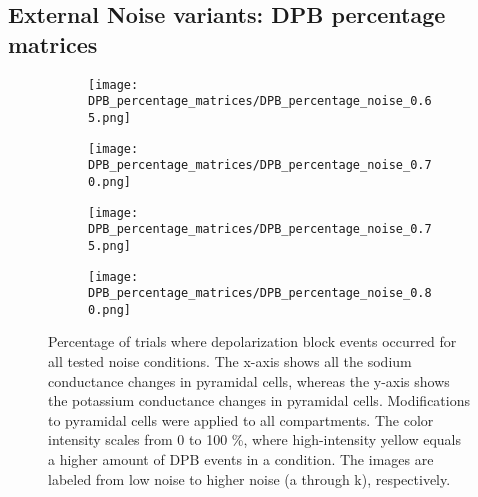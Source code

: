 \subsection{External Noise variants: DPB percentage matrices}\label{subsec:DPB_percentage_matrices}
\begin{figure}[!ht]
    \centering
    \begin{subfigure}{0.48\textwidth}
        \texttt{[image: DPB\_percentage\_matrices/DPB\_percentage\_noise\_0.65.png]}
        \caption{} %
    \end{subfigure}\hfill
    \begin{subfigure}{0.48\textwidth}
        \texttt{[image: DPB\_percentage\_matrices/DPB\_percentage\_noise\_0.70.png]}
        \caption{} %
    \end{subfigure}

    \bigskip %

    \begin{subfigure}{0.48\textwidth}
        \texttt{[image: DPB\_percentage\_matrices/DPB\_percentage\_noise\_0.75.png]}
        \caption{} %
    \end{subfigure}\hfill
    \begin{subfigure}{0.48\textwidth}
        \texttt{[image: DPB\_percentage\_matrices/DPB\_percentage\_noise\_0.80.png]}
        \caption{} %
    \end{subfigure}

    \caption[DPB percentage matrices (all)]{Percentage of trials where depolarization block events occurred for all tested noise conditions.
        The x-axis shows all the sodium conductance changes in pyramidal cells, whereas the y-axis shows the potassium conductance changes in pyramidal cells.
        Modifications to pyramidal cells were applied to all compartments.
        The color intensity scales from 0 to 100 \%, where high-intensity yellow equals a higher amount of DPB events in a condition.
        The images are labeled from low noise to higher noise (a through k), respectively.}\label{fig:dpb_percentage_matrices_all}
\end{figure}


